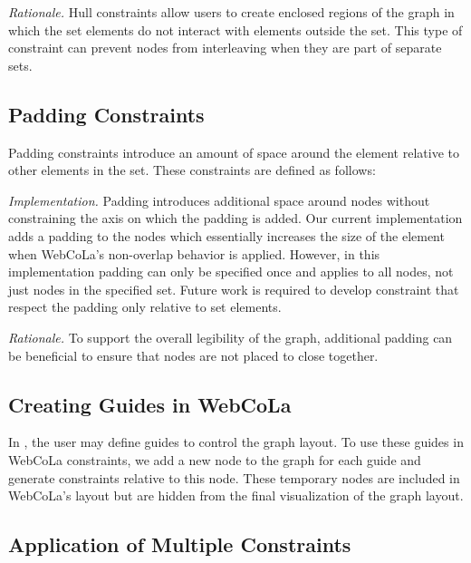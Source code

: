 \emph{Rationale.}
Hull constraints allow users to create enclosed regions of the graph in
which the set elements do not interact with elements outside the set. This
type of constraint can prevent nodes from interleaving when they are part
of separate sets.


\subsection{Padding Constraints}
Padding constraints introduce an amount of space around the element relative
to other elements in the set. These constraints are defined as follows:


\emph{Implementation.}
Padding introduces additional space around nodes without constraining the
axis on which the padding is added. Our current implementation adds a
padding to the nodes which essentially increases the size of the element
when WebCoLa's non-overlap behavior is applied. However, in this implementation
padding can only be specified once and applies to all nodes, not just nodes
in the specified set. Future work is required to develop constraint that
respect the padding only relative to set elements.

\emph{Rationale.}
To support the overall legibility of the graph, additional padding can be
beneficial to ensure that nodes are not placed to close together.

\subsection{Creating Guides in WebCoLa}
In \projectname, the user may define guides to control the graph layout.
To use these guides in WebCoLa constraints, we add a new node to the graph
for each guide and generate constraints relative to this node. These 
temporary nodes are included in WebCoLa's layout but are hidden from the
final visualization of the graph layout.

\subsection{Application of Multiple Constraints}

